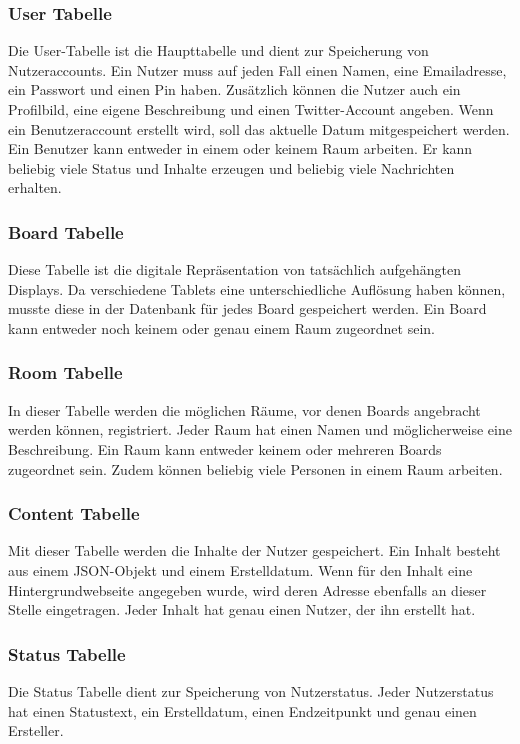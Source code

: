 \subsubsection{User Tabelle}\label{User Tabelle}
Die User-Tabelle ist die Haupttabelle und dient zur Speicherung von Nutzeraccounts. Ein Nutzer muss auf jeden Fall einen Namen, eine Emailadresse, ein Passwort und einen Pin haben.
Zusätzlich können die Nutzer auch ein Profilbild, eine eigene Beschreibung und einen Twitter-Account angeben.
Wenn ein Benutzeraccount erstellt wird, soll das aktuelle Datum mitgespeichert werden.
\\
Ein Benutzer kann entweder in einem oder keinem Raum arbeiten. Er kann beliebig viele Status und Inhalte erzeugen und beliebig viele Nachrichten erhalten.
\subsubsection{Board Tabelle}\label{Board Tabelle}
Diese Tabelle ist die digitale Repräsentation von tatsächlich aufgehängten Displays. Da verschiedene Tablets eine unterschiedliche Auflösung haben können, musste diese in der Datenbank für jedes Board gespeichert werden. Ein Board kann entweder noch keinem oder genau einem Raum zugeordnet sein.
\subsubsection{Room Tabelle}\label{Room Tabelle}
In dieser Tabelle werden die möglichen Räume, vor denen Boards angebracht werden können, registriert. Jeder Raum hat einen Namen und möglicherweise eine Beschreibung. Ein Raum kann entweder keinem oder mehreren Boards zugeordnet sein. Zudem können beliebig viele Personen in einem Raum arbeiten.
\subsubsection{Content Tabelle}\label{Content Tabelle}
Mit dieser Tabelle werden die Inhalte der Nutzer gespeichert. Ein Inhalt besteht aus einem JSON-Objekt und einem Erstelldatum. Wenn für den Inhalt eine Hintergrundwebseite angegeben wurde, wird deren Adresse ebenfalls an dieser Stelle eingetragen. Jeder Inhalt hat genau einen Nutzer, der ihn erstellt hat.
\subsubsection{Status Tabelle}\label{Status Tabelle}
Die Status Tabelle dient zur Speicherung von Nutzerstatus. Jeder Nutzerstatus hat einen Statustext, ein Erstelldatum, einen Endzeitpunkt und genau einen Ersteller.

